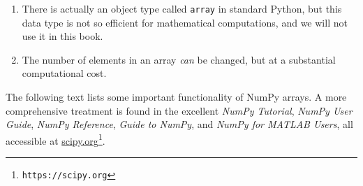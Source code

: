 \documentclass[graybox,sectrefs,envcountresetchap,open=right,final]{svmonodo}
\newenvironment{notice_mdfboxadmon}[1][]{
\begin{notice_mdfboxmdframed}[frametitle=#1]
}
{
\end{notice_mdfboxmdframed}
}
\begin{document}
\begin{notice_mdfboxadmon}[Remarks]

\begin{enumerate}
\item There is actually an object type called \texttt{array} in standard Python, but this data type is not so efficient for mathematical computations, and we will not use it in this book.

\item The number of elements in an array \emph{can} be changed, but at a substantial computational cost.
\end{enumerate}

\noindent
\end{notice_mdfboxadmon} %



The following text lists some important functionality of NumPy arrays.
A more comprehensive treatment is found in the excellent \emph{NumPy
Tutorial}, \emph{NumPy User Guide}, \emph{NumPy Reference}, \emph{Guide to NumPy},
and \emph{NumPy for MATLAB Users}, all accessible at \href{{https://scipy.org}}{scipy.org}\footnote{\texttt{https://scipy.org}}.

 
 
\end{document}
